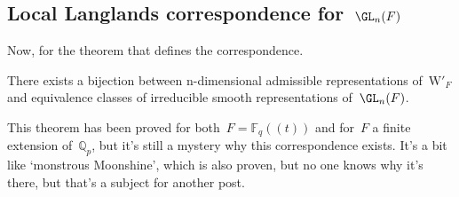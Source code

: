 \subsection{Local Langlands correspondence for~$\GL_n(F)$}
Now, for the theorem that defines the correspondence.

\begin{theorem}
  There exists a bijection between n-dimensional admissible representations of~$\mathrm{W}'_F$ and equivalence classes of irreducible smooth representations of~$\GL_n(F)$.
\end{theorem}

This theorem has been proved for both~$F = \mathbb{F}_q (\!(t)\!)$ and for~$F$ a finite extension of~$\mathbb{Q}_p$, but it's still a mystery why this correspondence exists. It's a bit like `monstrous Moonshine', which is also proven, but no one knows why it's there, but that's a subject for another post.
